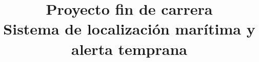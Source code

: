 \title{ {\Large \textbf{Proyecto fin de carrera}} \vspace{1 cm} \\  {\huge \textbf{Sistema de localización marítima y alerta temprana}}
}